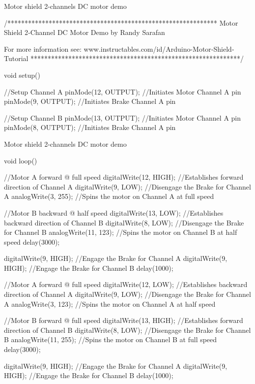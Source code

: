 \documentclass[compress]{beamer}
\begin{document}
\begin{frame}[fragile]{Motor shield 2-channels DC motor demo}

\begin{cppcode}
/*************************************************************
Motor Shield 2‐Channel DC Motor Demo
by Randy Sarafan
  
For more information see:
www.instructables.com/id/Arduino-Motor‐Shield‐Tutorial
*************************************************************/
  
  
void  setup()
{
  //Setup Channel A
  pinMode(12, OUTPUT);  //Initiates  Motor  Channel  A  pin
  pinMode(9,  OUTPUT);  //Initiates  Brake  Channel  A  pin
  
  //Setup  Channel  B
  pinMode(13,  OUTPUT);  //Initiates  Motor  Channel  A  pin
  pinMode(8,  OUTPUT);    //Initiates  Brake  Channel  A  pin
}
\end{cppcode}

\end{frame}

\begin{frame}[fragile]{Motor shield 2-channels DC motor demo}

\begin{cppcode}
void loop(){
  //Motor A forward @ full speed
  digitalWrite(12, HIGH); //Establishes forward direction of Channel A
  digitalWrite(9, LOW); //Disengage the Brake for Channel A
  analogWrite(3, 255); //Spins the motor on Channel A at full speed

  //Motor B backward @ half speed
  digitalWrite(13, LOW); //Establishes backward direction of Channel B
  digitalWrite(8, LOW); //Disengage the Brake for Channel B
  analogWrite(11, 123); //Spins the motor on Channel B at half speed
  delay(3000);

  digitalWrite(9, HIGH); //Engage the Brake for Channel A
  digitalWrite(9, HIGH); //Engage the Brake for Channel B
  delay(1000);

  //Motor A forward @ full speed
  digitalWrite(12, LOW); //Establishes backward direction of Channel A
  digitalWrite(9, LOW); //Disengage the Brake for Channel A
  analogWrite(3, 123); //Spins the motor on Channel A at half speed

  //Motor B forward @ full speed
  digitalWrite(13, HIGH); //Establishes forward direction of Channel B
  digitalWrite(8, LOW); //Disengage the Brake for Channel B
  analogWrite(11, 255); //Spins the motor on Channel B at full speed
  delay(3000);

  digitalWrite(9, HIGH); //Engage the Brake for Channel A
  digitalWrite(9, HIGH); //Engage the Brake for Channel B
  delay(1000);
}
\end{cppcode}

\end{frame}
\end{document}
